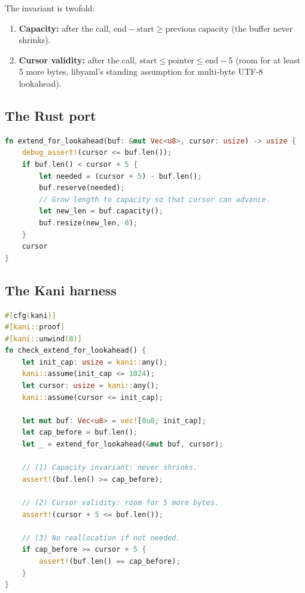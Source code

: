 \documentclass[12pt]{article}
\theoremstyle{definition}
\theoremstyle{remark}
\begin{document}
The invariant is twofold:
\begin{enumerate}
\item \textbf{Capacity:} after the call,
  $\mathrm{end} - \mathrm{start} \ge \mathrm{previous\;capacity}$
  (the buffer never shrinks).
\item \textbf{Cursor validity:} after the call,
  $\mathrm{start} \le \mathrm{pointer} \le \mathrm{end} - 5$
  (room for at least 5 more bytes, libyaml's standing assumption for
  multi-byte UTF-8 lookahead).
\end{enumerate}

\subsection{The Rust port}

\begin{lstlisting}[language=Rust]
fn extend_for_lookahead(buf: &mut Vec<u8>, cursor: usize) -> usize {
    debug_assert!(cursor <= buf.len());
    if buf.len() < cursor + 5 {
        let needed = (cursor + 5) - buf.len();
        buf.reserve(needed);
        // Grow length to capacity so that cursor can advance.
        let new_len = buf.capacity();
        buf.resize(new_len, 0);
    }
    cursor
}
\end{lstlisting}

\subsection{The Kani harness}

\begin{lstlisting}[language=Rust]
#[cfg(kani)]
#[kani::proof]
#[kani::unwind(8)]
fn check_extend_for_lookahead() {
    let init_cap: usize = kani::any();
    kani::assume(init_cap <= 1024);
    let cursor: usize = kani::any();
    kani::assume(cursor <= init_cap);

    let mut buf: Vec<u8> = vec![0u8; init_cap];
    let cap_before = buf.len();
    let _ = extend_for_lookahead(&mut buf, cursor);

    // (1) Capacity invariant: never shrinks.
    assert!(buf.len() >= cap_before);

    // (2) Cursor validity: room for 5 more bytes.
    assert!(cursor + 5 <= buf.len());

    // (3) No reallocation if not needed.
    if cap_before >= cursor + 5 {
        assert!(buf.len() == cap_before);
    }
}
\end{lstlisting}
\end{document}

